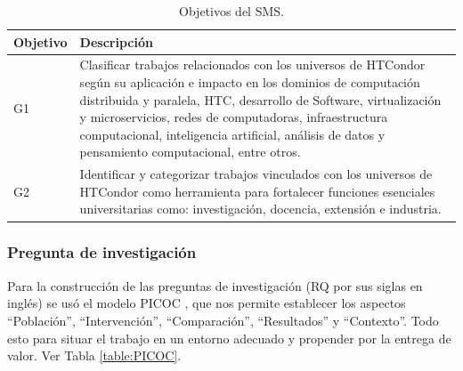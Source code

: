 \begin{table}[htbp]

	\centering
	\renewcommand{\arraystretch}{1.7}  %
	\setlength{\tabcolsep}{3pt}      %
	\vspace{10pt}                     %
	\begin{tabular}{|>{\arraybackslash}m{1cm}|>{\arraybackslash}m{7cm}|}
		\hline
		\textbf{Objetivo} & \textbf{Descripción}                                                                                                                                                                                                                                                                                                                                         \\
		\hline
		G1                & Clasificar trabajos relacionados con los universos de HTCondor según su aplicación e impacto en los dominios de computación distribuida y paralela, HTC, desarrollo de Software, virtualización y microservicios, redes de computadoras, infraestructura computacional, inteligencia artificial, análisis de datos y pensamiento computacional, entre otros. \\
		\hline
		G2                & Identificar y categorizar trabajos vinculados con los universos de HTCondor como herramienta para fortalecer funciones esenciales universitarias como: investigación, docencia, extensión e industria.                                                                                                                                                       \\
		\hline
	\end{tabular}
	\vspace{6pt}  %
	\caption{Objetivos del SMS.}
	\label{table:Goals}

\end{table}

\subsubsection{Pregunta de investigación}
Para la construcción de las preguntas de investigación (RQ por sus siglas en inglés) se usó el modelo PICOC \cite{Needleman20026, Petticrew2008systematic}, que nos permite establecer los aspectos ``Población'', ``Intervención'', ``Comparación'', ``Resultados'' y ``Contexto''. Todo esto para situar el trabajo en un entorno adecuado y propender por la entrega de valor. Ver Tabla \ref{table:PICOC}.

